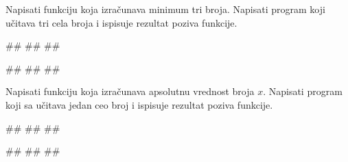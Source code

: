 \begin{Exercise}[label=p1.4_01] 
Napisati funkciju  koja izračunava
minimum tri broja. Napisati program koji učitava tri cela broja i
ispisuje rezultat poziva funkcije.

\begin{miditest}
\begin{upotreba}{1}
#\naslovInt#
##
##
\end{upotreba}
\end{miditest}
\begin{miditest}
\begin{upotreba}{2}
#\naslovInt#
##
##
\end{upotreba}
\end{miditest}
\end{Exercise}
\begin{Answer}[ref=p1.4_01]
\end{Answer}


\begin{Exercise}[label=p1.4_02] 
Napisati funkciju  koja
izračunava apsolutnu vrednost broja $x$. Napisati program koji sa
učitava jedan ceo broj i ispisuje rezultat poziva funkcije.

\begin{miditest}
\begin{upotreba}{1}
#\naslovInt#
##
##
\end{upotreba}
\end{miditest}
\begin{miditest}
\begin{upotreba}{2}
#\naslovInt#
##
##
\end{upotreba}
\end{miditest}

\end{Exercise}
\begin{Answer}[ref=p1.4_02]
\end{Answer}


